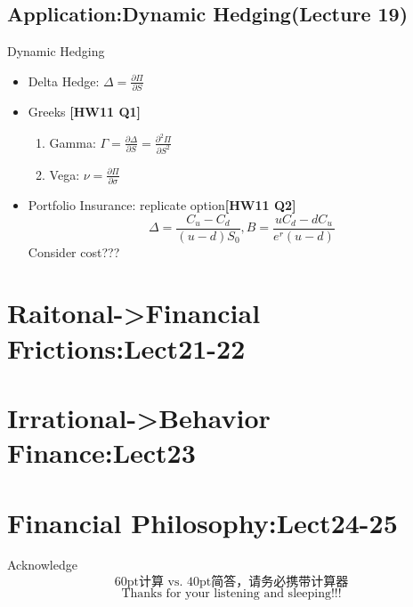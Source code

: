 \documentclass{beamer}
\begin{document}
	 \subsection{Application:Dynamic Hedging(Lecture 19)}
	 \begin{frame}[shrink]{Dynamic Hedging}
		\begin{itemize}
			\item Delta Hedge: $\Delta =\frac{\partial \Pi}{\partial S}$
			\item Greeks \textbf{[HW11 Q1]}
				\begin{enumerate}
					\item Gamma: $\Gamma=\frac{\partial \Delta}{\partial S}=\frac{\partial^2 \Pi}{\partial S^2}$
					\item Vega: $\nu=\frac{\partial \Pi}{\partial \sigma}$
				\end{enumerate}
			\item Portfolio Insurance: replicate option\textbf{[HW11 Q2]}
				$$\Delta=\frac{C_u-C_d}{(u-d)S_0},B=\frac{uC_d-dC_u}{e^r(u-d)}$$ 
				Consider cost???
		\end{itemize}
	\end{frame}


	
	
	\section{Raitonal->Financial Frictions:Lect21-22}
	\section{Irrational->Behavior Finance:Lect23}
	\section{Financial Philosophy:Lect24-25}
	
	
	
 	\begin{frame}{Acknowledge}
 		$$\text{60pt计算 vs. 40pt简答，请务必携带计算器}$$
		$$\text{Thanks for your listening and sleeping!!!}$$
 	\end{frame}



\end{document}
